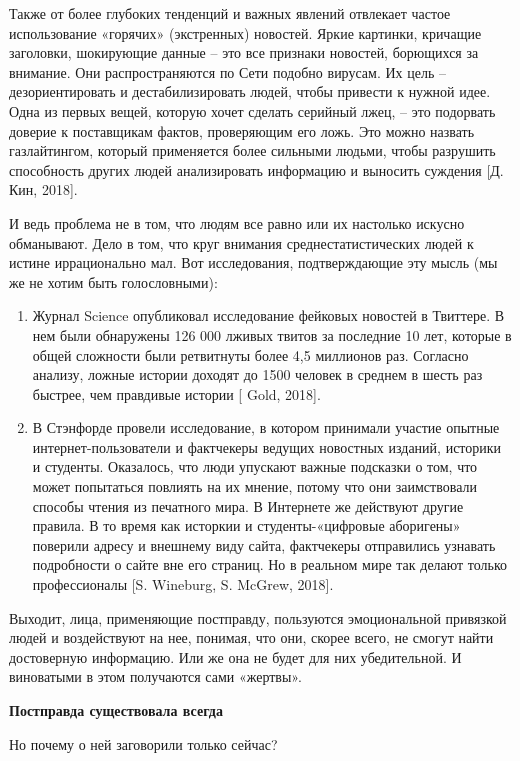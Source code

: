 Также от более глубоких тенденций и важных явлений отвлекает частое использование «горячих» (экстренных) новостей. Яркие картинки, кричащие заголовки, шокирующие данные – это все признаки новостей, борющихся за внимание. Они распространяются по Сети подобно вирусам. Их цель – дезориентировать и дестабилизировать людей, чтобы привести к нужной идее. Одна из первых вещей, которую хочет сделать серийный лжец, – это подорвать доверие к поставщикам фактов, проверяющим его ложь. Это можно назвать газлайтингом, который применяется более сильными людьми, чтобы разрушить способность других людей анализировать информацию и выносить суждения [Д. Кин, 2018].

И ведь проблема не в том, что людям все равно или их настолько искусно обманывают. Дело в том, что круг внимания среднестатистических людей к истине иррационально мал. Вот исследования, подтверждающие эту мысль (мы же не хотим быть голословными):

\begin{enumerate}
    \item Журнал Science опубликовал исследование фейковых новостей в Твиттере. В нем были обнаружены 126 000 лживых твитов за последние 10 лет, которые в общей сложности были ретвитнуты более 4,5 миллионов раз. Согласно анализу, ложные истории доходят до 1500 человек в среднем в шесть раз быстрее, чем правдивые истории [ Gold, 2018].
    \item В Стэнфорде провели исследование, в котором принимали участие опытные интернет-пользователи и фактчекеры ведущих новостных изданий, историки и студенты. Оказалось, что люди упускают важные подсказки о том, что может попытаться повлиять на их мнение, потому что они заимствовали способы чтения из печатного мира. В Интернете же действуют другие правила. В то время как исторкии и студенты-«цифровые аборигены» поверили адресу и внешнему виду сайта, фактчекеры отправились узнавать подробности о сайте вне его страниц. Но в реальном мире так делают только профессионалы [S. Wineburg, S. McGrew, 2018].
\end{enumerate}

Выходит, лица, применяющие постправду, пользуются эмоциональной привязкой людей и воздействуют на нее, понимая, что они, скорее всего, не смогут найти достоверную информацию. Или же она не будет для них убедительной. И виноватыми в этом получаются сами «жертвы».

\textbf{Постправда существовала всегда}

Но почему о ней заговорили только сейчас?


